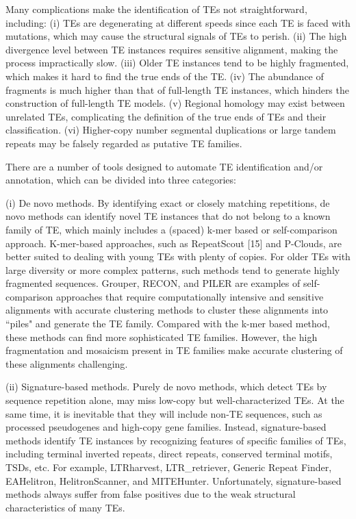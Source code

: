 \documentclass{bmcart}
\begin{document}
Many complications make the identification of TEs not straightforward, including: (i) TEs are degenerating at different speeds since each TE is faced with mutations, which may cause the structural signals of TEs to perish. (ii) The high divergence level between TE instances requires sensitive alignment, making the process impractically slow. (iii) Older TE instances tend to be highly fragmented, which makes it hard to find the true ends of the TE. (iv) The abundance of fragments is much higher than that of full-length TE instances, which hinders the construction of full-length TE models. (v) Regional homology may exist between unrelated TEs, complicating the definition of the true ends of TEs and their classification. (vi) Higher-copy number segmental duplications or large tandem repeats may be falsely regarded as putative TE families\cite{storer2022methodologies}.

There are a number of tools designed to automate TE identification and/or annotation, which can be divided into three categories:

(i) De novo methods. By identifying exact or closely matching repetitions, de novo methods can identify novel TE instances that do not belong to a known family of TE, which mainly includes a (spaced) k-mer based or self-comparison approach. K-mer-based approaches, such as RepeatScout [15] and P-Clouds\cite{gu2008identification}, are better suited to dealing with young TEs with plenty of copies. For older TEs with large diversity or more complex patterns, such methods tend to generate highly fragmented sequences. Grouper\cite{quesneville2003detection}, RECON\cite{bao2002automated}, and PILER\cite{edgar2005piler} are examples of self-comparison approaches that require computationally intensive and sensitive alignments with accurate clustering methods to cluster these alignments into ``piles" and generate the TE family. Compared with the k-mer based method, these methods can find more sophisticated TE families. However, the high fragmentation and mosaicism present in TE families make accurate clustering of these alignments challenging\cite{storer2022methodologies}.

(ii) Signature-based methods. Purely de novo methods, which detect TEs by sequence repetition alone, may miss low-copy but well-characterized TEs. At the same time, it is inevitable that they will include non-TE sequences, such as processed pseudogenes and high-copy gene families. Instead, signature-based methods identify TE instances by recognizing features of specific families of TEs, including terminal inverted repeats, direct repeats, conserved terminal motifs, TSDs, etc. For example, LTRharvest\cite{ellinghaus2008ltrharvest}, LTR\_retriever\cite{ou2018ltr_retriever}, Generic Repeat Finder\cite{shi2019generic}, EAHelitron\cite{hu2019helitron}, HelitronScanner\cite{xiong2014helitronscanner}, and MITEHunter. Unfortunately, signature-based methods always suffer from false positives due to the weak structural characteristics of many TEs.
\end{document}
